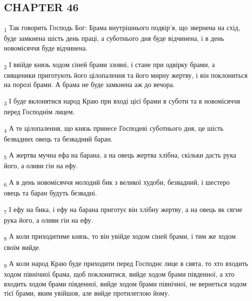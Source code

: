 \subsection{CHAPTER 46}
\begin{tcolorbox}
\textsubscript{1} Так говорить Господь Бог: Брама внутрішнього подвір'я, що звернена на схід, буде замкнена шість день праці, а суботнього дня буде відчинена, і в день новомісяччя буде відчинена.
\end{tcolorbox}
\begin{tcolorbox}
\textsubscript{2} І ввійде князь ходом сіней брами ззовні, і стане при одвірку брами, а священики приготують його цілопалення та його мирну жертву, і він поклониться на порозі брами. А брама не буде замкнена аж до вечора.
\end{tcolorbox}
\begin{tcolorbox}
\textsubscript{3} І буде вклонятися народ Краю при вході цієї брами в суботи та в новомісяччя перед Господнім лицем.
\end{tcolorbox}
\begin{tcolorbox}
\textsubscript{4} А те цілопалення, що князь принесе Господеві суботнього дня, це шість безвадних овець та безвадний баран.
\end{tcolorbox}
\begin{tcolorbox}
\textsubscript{5} А жертва мучна ефа на барана, а на овець жертва хлібна, скільки дасть рука його, а оливи гін на ефу.
\end{tcolorbox}
\begin{tcolorbox}
\textsubscript{6} А в день новомісяччя молодий бик з великої худоби, безвадний, і шестеро овець та баран будуть безвадні.
\end{tcolorbox}
\begin{tcolorbox}
\textsubscript{7} І ефу на бика, і ефу на барана приготує він хлібну жертву, а на овець як сягне рука його, а оливи гін на ефу.
\end{tcolorbox}
\begin{tcolorbox}
\textsubscript{8} А коли приходитиме князь, то він увійде ходом сіней брами, і тим же ходом своїм вийде.
\end{tcolorbox}
\begin{tcolorbox}
\textsubscript{9} А коли народ Краю буде приходити перед Господнє лице в свята, то хто входить ходом північної брама, щоб поклонитися, вийде ходом брами південної, а хто входить ходом брами південної, вийде ходом брами північної, не вернеться ходом тієї брами, яким увійшов, але вийде протилеглою йому.
\end{tcolorbox}
